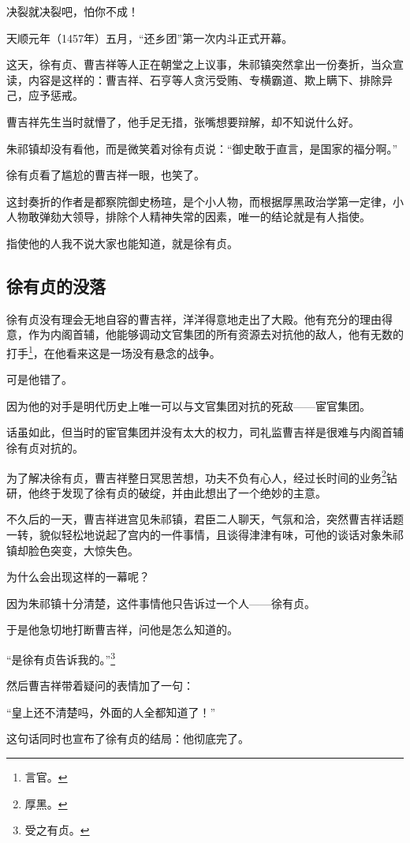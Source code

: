 \begin{multicols}{\theparacolNo}
		决裂就决裂吧，怕你不成！

		天顺元年（1457年）五月，“还乡团”第一次内斗正式开幕。

		这天，徐有贞、曹吉祥等人正在朝堂之上议事，朱祁镇突然拿出一份奏折，当众宣读，内容是这样的：曹吉祥、石亨等人贪污受贿、专横霸道、欺上瞒下、排除异己，应予惩戒。

		曹吉祥先生当时就懵了，他手足无措，张嘴想要辩解，却不知说什么好。

		朱祁镇却没有看他，而是微笑着对徐有贞说：“御史敢于直言，是国家的福分啊。”

		徐有贞看了尴尬的曹吉祥一眼，也笑了。

		这封奏折的作者是都察院御史杨瑄，是个小人物，而根据厚黑政治学第一定律，小人物敢弹劾大领导，排除个人精神失常的因素，唯一的结论就是有人指使。

		指使他的人我不说大家也能知道，就是徐有贞。

		\subsection{徐有贞的没落}
		徐有贞没有理会无地自容的曹吉祥，洋洋得意地走出了大殿。他有充分的理由得意，作为内阁首辅，他能够调动文官集团的所有资源去对抗他的敌人，他有无数的打手\footnote{言官。}，在他看来这是一场没有悬念的战争。

		可是他错了。

		因为他的对手是明代历史上唯一可以与文官集团对抗的死敌——宦官集团。

		话虽如此，但当时的宦官集团并没有太大的权力，司礼监曹吉祥是很难与内阁首辅徐有贞对抗的。

		为了解决徐有贞，曹吉祥整日冥思苦想，功夫不负有心人，经过长时间的业务\footnote{厚黑。}钻研，他终于发现了徐有贞的破绽，并由此想出了一个绝妙的主意。

		不久后的一天，曹吉祥进宫见朱祁镇，君臣二人聊天，气氛和洽，突然曹吉祥话题一转，貌似轻松地说起了宫内的一件事情，且谈得津津有味，可他的谈话对象朱祁镇却脸色突变，大惊失色。

		为什么会出现这样的一幕呢？

		因为朱祁镇十分清楚，这件事情他只告诉过一个人——徐有贞。

		于是他急切地打断曹吉祥，问他是怎么知道的。

		“是徐有贞告诉我的。”\footnote{受之有贞。}

		然后曹吉祥带着疑问的表情加了一句：

		“皇上还不清楚吗，外面的人全都知道了！”

		这句话同时也宣布了徐有贞的结局：他彻底完了。


\end{multicols}
